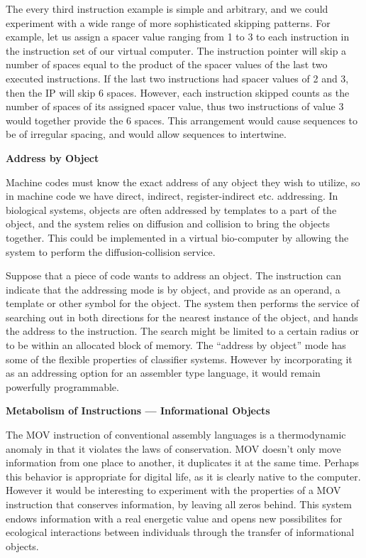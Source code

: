 The every third instruction example is simple and arbitrary, and we could
experiment with a wide range of more sophisticated skipping patterns.  For
example, let us assign a spacer value ranging from 1 to 3 to each instruction
in the instruction set of our virtual computer.  The instruction pointer will
skip a number of spaces equal to the product of the spacer values of the last
two executed instructions.  If the last two instructions had spacer values
of 2 and 3, then the IP will skip 6 spaces.  However, each instruction skipped
counts as the number of spaces of its assigned spacer value, thus two
instructions of value 3 would together provide the 6 spaces.  This arrangement
would cause sequences to be of irregular spacing, and would allow sequences
to intertwine.

\pagebreak

\LP
\bf Address by Object\rm
\eLP

Machine codes must know the exact address of any object they wish to
utilize, so in machine code we have direct, indirect, register-indirect etc.
addressing.  In biological systems, objects are often addressed by
templates to a part of the object, and the system relies on diffusion and
collision to bring the objects together.  This could be implemented in a
virtual bio-computer by allowing the system to perform the diffusion-collision
service.

Suppose that a piece of code wants to address an object.  The instruction
can indicate that the addressing mode is by object, and provide as an operand,
a template or other symbol for the object.  The system then performs the
service of searching out in both directions for the nearest instance of the
object, and hands the address to the instruction.  The search might be limited
to a certain radius or to be within an allocated block of memory.  The
``address by object'' mode has some of the flexible properties of classifier
systems.  However by incorporating it as an addressing option for an assembler
type language, it would remain powerfully programmable.

\LP
\bf Metabolism of Instructions --- Informational Objects\rm
\eLP

The MOV instruction of conventional assembly languages is a thermodynamic
anomaly in that it violates the laws of conservation.  MOV doesn't only
move information from one place to another, it duplicates it at the same
time.  Perhaps this behavior is appropriate for digital life, as it is
clearly native to the computer.  However it would be interesting to
experiment with the properties of a MOV instruction that conserves information,
by leaving all zeros behind.  This system endows information with a real
energetic value and opens new possibilites for ecological interactions
between individuals through the transfer of informational objects.

